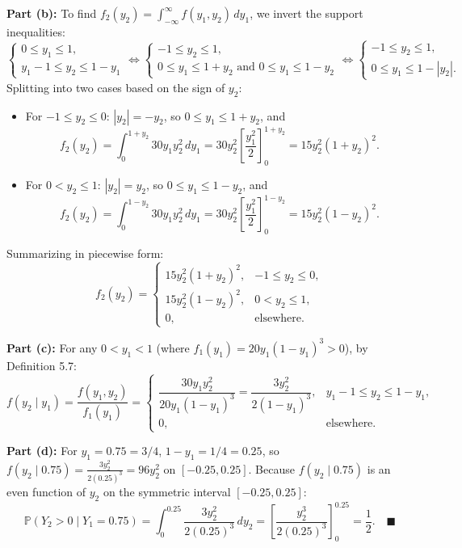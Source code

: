 \documentclass[11pt, letterpaper]{article}
\theoremstyle{definition}
\theoremstyle{remark}
\newcommand{\Prob}{\mathbb{P}}
\begin{document}
\textbf{Part (b):} To find $f_2(y_2) = \int_{-\infty}^\infty f(y_1, y_2) \, dy_1$, we invert the support inequalities:
\[ \begin{cases} 0 \le y_1 \le 1, \\ y_1 - 1 \le y_2 \le 1 - y_1 \end{cases} \iff \begin{cases} -1 \le y_2 \le 1, \\ 0 \le y_1 \le 1 + y_2 \text{ and } 0 \le y_1 \le 1 - y_2 \end{cases} \iff \begin{cases} -1 \le y_2 \le 1, \\ 0 \le y_1 \le 1 - |y_2|. \end{cases} \]
Splitting into two cases based on the sign of $y_2$:
\begin{itemize}
    \item For $-1 \le y_2 \le 0$: $|y_2| = -y_2$, so $0 \le y_1 \le 1 + y_2$, and
    \[ f_2(y_2) = \int_0^{1 + y_2} 30y_1 y_2^2 \, dy_1 = 30y_2^2 \left[ \frac{y_1^2}{2} \right]_0^{1 + y_2} = 15y_2^2(1 + y_2)^2. \]
    \item For $0 < y_2 \le 1$: $|y_2| = y_2$, so $0 \le y_1 \le 1 - y_2$, and
    \[ f_2(y_2) = \int_0^{1 - y_2} 30y_1 y_2^2 \, dy_1 = 30y_2^2 \left[ \frac{y_1^2}{2} \right]_0^{1 - y_2} = 15y_2^2(1 - y_2)^2. \]
\end{itemize}
Summarizing in piecewise form:
\[ f_2(y_2) = \begin{cases} 15y_2^2(1 + y_2)^2, & -1 \le y_2 \le 0, \\ 15y_2^2(1 - y_2)^2, & 0 < y_2 \le 1, \\ 0, & \text{elsewhere.} \end{cases} \]

\textbf{Part (c):} For any $0 < y_1 < 1$ (where $f_1(y_1) = 20y_1(1 - y_1)^3 > 0$), by Definition 5.7:
\[ f(y_2 \mid y_1) = \frac{f(y_1, y_2)}{f_1(y_1)} = \begin{cases} \dfrac{30y_1 y_2^2}{20y_1(1 - y_1)^3} = \dfrac{3y_2^2}{2(1 - y_1)^3}, & y_1 - 1 \le y_2 \le 1 - y_1, \\ 0, & \text{elsewhere.} \end{cases} \]

\textbf{Part (d):} For $y_1 = 0.75 = 3/4$, $1 - y_1 = 1/4 = 0.25$, so $f(y_2 \mid 0.75) = \frac{3y_2^2}{2(0.25)^3} = 96y_2^2$ on $[-0.25, 0.25]$. Because $f(y_2 \mid 0.75)$ is an even function of $y_2$ on the symmetric interval $[-0.25, 0.25]$:
\[ \Prob(Y_2 > 0 \mid Y_1 = 0.75) = \int_0^{0.25} \frac{3y_2^2}{2(0.25)^3} \, dy_2 = \left[ \frac{y_2^3}{2(0.25)^3} \right]_0^{0.25} = \frac{1}{2}. \quad \blacksquare \]
\end{document}
